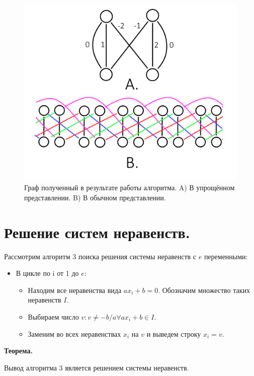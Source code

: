 \documentclass[14pt]{mmcs_article}
\begin{document}
\begin{figure}[H]
  \centering
  \includegraphics[scale=0.5]{Fig_7.png}
  \caption{ Граф полученный в результате работы алгоритма. A) В упрощённом представлении. B) В обычном представлении. }
  \label{stud:fig:7}
\end{figure}

\newpage

\section{Решение систем неравенств.}

Рассмотрим алгоритм 3 поиска решения системы неравенств с $e$ переменными:

\begin{itemize}
  \item В цикле по i от 1 до $e$:
  \begin{itemize}
    \item Находим все неравенства  вида $a x_i + b = 0$. Обозначим множество таких неравенств $I$.
    \item Выбираем число $v: v \neq -b/a \forall a x_i + b \in I$.
    \item Заменим во всех неравенствах $x_i$ на $v$ и выведем строку $x_i = v$.
  \end{itemize}
\end{itemize}

\textbf{Теорема.}

Вывод алгоритма 3 является решением системы неравенств.
\end{document}
